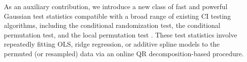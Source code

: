 \documentclass[12pt]{article}
\begin{document}
As an auxiliary contribution, we introduce a new class of fast and powerful Gaussian test statistics compatible with a broad range of existing CI testing algorithms, including the conditional randomization test, the conditional permutation test, and the local permutation test \parencite{Candes2018a,Berrett2020,Kim2021}. These test statistics involve repeatedly fitting OLS, ridge regression, or additive spline models to the permuted (or resampled) data via an online QR decomposition-based procedure.


\printbibliography
 
\end{document}
